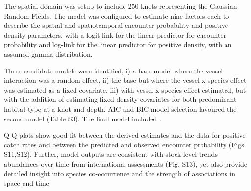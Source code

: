 \documentclass[12pt]{article}
\begin{document}
\begin{linenumbers}
The spatial domain was setup to include 250 knots representing the Gaussian
Random Fields. The model was configured to estimate nine factors each to describe
the spatial and spatiotemporal encounter probability and positive density
parameters, with a logit-link for the linear predictor for encounter
probability and log-link for the linear predictor for positive density, with an
assumed gamma distribution.

Three candidate models were identified, i) a base model where the vessel
interaction was a random effect, ii) the base but where the vessel x species
effect was estimated as a fixed covariate, iii) with vessel x species effect
estimated, but with the addition of estimating fixed density covariates for
both predominant habitat type at a knot and depth. AIC and BIC model selection
favoured the second model (Table S3). The final model included
.

Q-Q plots show good fit between the derived estimates and the data for positive
catch rates and between the predicted and observed encounter probability
(Figs. S11,S12).  Further, model outputs are consistent with
stock-level trends abundances over time from international assessments
(Fig. S13), yet also provide detailed insight into species
co-occurrence and the strength of associations in space and time. 



\clearpage


\end{linenumbers}
\end{document}
